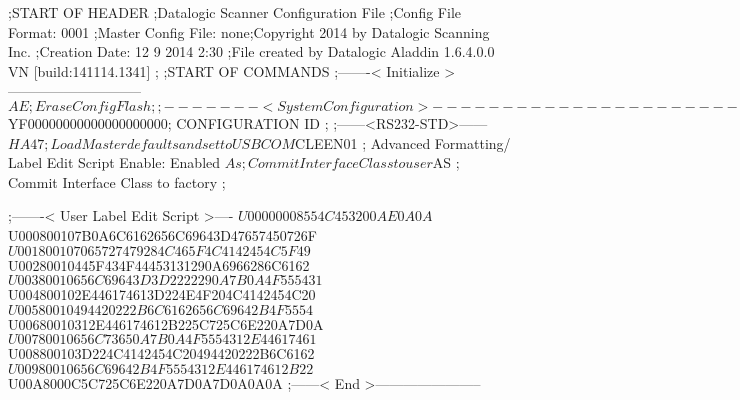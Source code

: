 ;START OF HEADER
;Datalogic Scanner Configuration File
;Config File Format: 0001
;Master Config File: none;Copyright 2014 by Datalogic Scanning Inc.
;Creation Date: 12 9 2014 2:30
;File created by Datalogic Aladdin 1.6.4.0.0 VN [build:141114.1341]
;
;START OF COMMANDS
;-------< Initialize >-----------------------------
$AE                 ; Erase Config Flash
;
;-------< System Configuration >-------------------------------
$YF00000000000000000000; CONFIGURATION ID
;
;------<RS232-STD>------
$HA47               ; Load Master defaults and set to USBCOM
$CLEEN01            ; Advanced Formatting/ Label Edit Script Enable: Enabled
$As                 ; Commit Interface Class to user
$AS                 ; Commit Interface Class to factory
;

;-------< User Label Edit Script >----
$U00000008554C453200AE0A0A
$U000800107B0A6C6162656C69643D47657450726F
$U001800107065727479284C465F4C4142454C5F49
$U00280010445F434F44453131290A6966286C6162
$U00380010656C69643D3D2222290A7B0A4F555431
$U004800102E446174613D224E4F204C4142454C20
$U00580010494420222B6C6162656C69642B4F5554
$U00680010312E446174612B225C725C6E220A7D0A
$U00780010656C73650A7B0A4F5554312E44617461
$U008800103D224C4142454C20494420222B6C6162
$U00980010656C69642B4F5554312E446174612B22
$U00A8000C5C725C6E220A7D0A7D0A0A0A
;------< End >-----------------------
